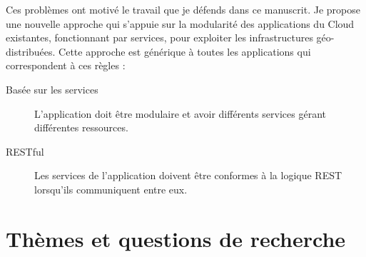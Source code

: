 



Ces problèmes ont motivé le travail que je défends dans ce manuscrit.
%
Je propose une nouvelle approche qui s'appuie sur la modularité des
applications du Cloud existantes, fonctionnant par services, pour
exploiter les infrastructures géo-distribuées.
%
Cette approche est générique à toutes les applications qui
correspondent à ces règles :
\begin{description}
\item[Basée sur les services] L'application doit être modulaire et
  avoir différents services gérant différentes ressources.
\item[RESTful] Les services de l'application doivent être conformes à
  la logique REST lorsqu'ils communiquent entre eux.
\end{description}





\section*{Thèmes et questions de recherche}

